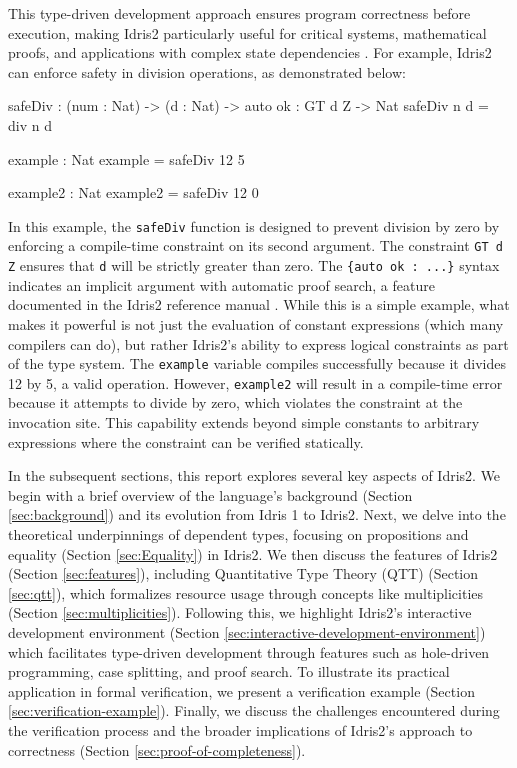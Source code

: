 \documentclass[]{rptuseminar}
\begin{document}
This type-driven development approach ensures program correctness before execution, making Idris2 particularly useful for critical systems, mathematical proofs, and applications with complex state dependencies \cite{brady2021idris}. For example, Idris2 can enforce safety in division operations, as demonstrated below:
\begin{idris}
safeDiv : (num : Nat) -> (d : Nat) -> {auto ok : GT d Z} -> Nat  
safeDiv n d  = div n d  

example : Nat  
example = safeDiv 12 5

example2 : Nat
example2 = safeDiv 12 0
\end{idris}
In this example, the \texttt{safeDiv} function is designed to prevent division by zero by enforcing a compile-time constraint on its second argument. The constraint \texttt{GT d Z} ensures that \texttt{d} will be strictly greater than zero. The \texttt{\{auto ok : ...\}} syntax indicates an implicit argument with automatic proof search, a feature documented in the Idris2 reference manual \cite{idris2-auto}. 
While this is a simple example, what makes it powerful is not just the evaluation of constant expressions (which many compilers can do), but rather Idris2's ability to express logical constraints as part of the type system. The \texttt{example} variable compiles successfully because it divides 12 by 5, a valid operation. However, \texttt{example2} will result in a compile-time error because it attempts to divide by zero, which violates the constraint at the invocation site. This capability extends beyond simple constants to arbitrary expressions where the constraint can be verified statically.


In the subsequent sections, this report explores several key aspects of Idris2.
We begin with a brief overview of the language's background (Section \ref{sec:background}) and its evolution from Idris 1 to Idris2. Next, we delve into the theoretical underpinnings of dependent types, focusing on propositions and equality (Section \ref{sec:Equality}) in Idris2. We then discuss the features of Idris2 (Section \ref{sec:features}), including Quantitative Type Theory (QTT) (Section \ref{sec:qtt}), which formalizes resource usage through concepts like multiplicities (Section \ref{sec:multiplicities}). Following this, we highlight Idris2's interactive development environment (Section \ref{sec:interactive-development-environment}) which facilitates type-driven development through features such as hole-driven programming, case splitting, and proof search. To illustrate its practical application in formal verification, we present a verification example (Section \ref{sec:verification-example}). Finally, we discuss the challenges encountered during the verification process and the broader implications of Idris2's approach to correctness (Section \ref{sec:proof-of-completeness}).
\end{document}
